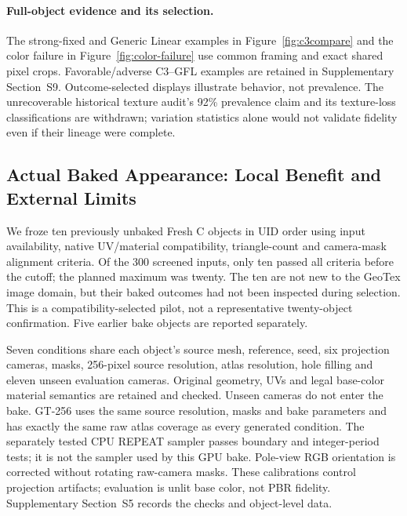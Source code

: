 \documentclass[times,twocolumn,final]{elsarticle}
\begin{document}
\paragraph{Full-object evidence and its selection.}
The strong-fixed and Generic Linear examples in Figure~\ref{fig:c3compare} and the color failure in Figure~\ref{fig:color-failure} use common framing and exact shared pixel crops. Favorable/adverse C3--GFL examples are retained in Supplementary Section~S9. Outcome-selected displays illustrate behavior, not prevalence. The unrecoverable historical texture audit's 92\% prevalence claim and its texture-loss classifications are withdrawn; variation statistics alone would not validate fidelity even if their lineage were complete.


\subsection{Actual Baked Appearance: Local Benefit and External Limits}
\label{subsec:new-bake}
We froze ten previously unbaked Fresh C objects in UID order using input availability, native UV/material compatibility, triangle-count and camera-mask alignment criteria. Of the 300 screened inputs, only ten passed all criteria before the cutoff; the planned maximum was twenty. The ten are not new to the GeoTex image domain, but their baked outcomes had not been inspected during selection. This is a compatibility-selected pilot, not a representative twenty-object confirmation. Five earlier bake objects are reported separately.

Seven conditions share each object's source mesh, reference, seed, six projection cameras, masks, 256-pixel source resolution, atlas resolution, hole filling and eleven unseen evaluation cameras. Original geometry, UVs and legal base-color material semantics are retained and checked. Unseen cameras do not enter the bake. GT-256 uses the same source resolution, masks and bake parameters and has exactly the same raw atlas coverage as every generated condition. The separately tested CPU REPEAT sampler passes boundary and integer-period tests; it is not the sampler used by this GPU bake. Pole-view RGB orientation is corrected without rotating raw-camera masks. These calibrations control projection artifacts; evaluation is unlit base color, not PBR fidelity. Supplementary Section~S5 records the checks and object-level data.
\end{document}
